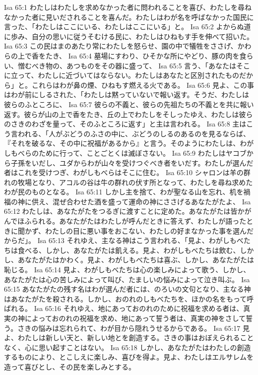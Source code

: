 Isa 65:1  わたしはわたしを求めなかった者に問われることを喜び、わたしを尋ねなかった者に見いだされることを喜んだ。わたしはわが名を呼ばなかった国民に言った、「わたしはここにいる、わたしはここにいる」と。
Isa 65:2  よからぬ道に歩み、自分の思いに従うそむける民に、わたしはひねもす手を伸べて招いた。
Isa 65:3  この民はまのあたり常にわたしを怒らせ、園の中で犠牲をささげ、かわらの上で香をたき、
Isa 65:4  墓場にすわり、ひそかな所にやどり、豚の肉を食らい、憎むべき物の、あつものをその器に盛って、
Isa 65:5  言う、「あなたはそこに立って、わたしに近づいてはならない。わたしはあなたと区別されたものだから」と。これらはわが鼻の煙、ひねもす燃える火である。
Isa 65:6  見よ、この事はわが前にしるされた、「わたしは黙っていないで報い返す。そうだ、わたしは彼らのふところに、
Isa 65:7  彼らの不義と、彼らの先祖たちの不義とを共に報い返す。彼らが山の上で香をたき、丘の上でわたしをそしったゆえ、わたしは彼らのさきのわざを量って、そのふところに返す」と主は言われる。
Isa 65:8  主はこう言われる、「人がぶどうのふさの中に、ぶどうのしるのあるのを見るならば、『それを破るな、その中に祝福があるから』と言う。そのようにわたしは、わがしもべらのために行って、ことごとくは滅ぼさない。
Isa 65:9  わたしはヤコブから子孫をいだし、ユダからわが山々を受けつぐべき者をいだす。わたしが選んだ者はこれを受けつぎ、わがしもべらはそこに住む。
Isa 65:10  シャロンは羊の群れの牧場となり、アコルの谷は牛の群れの伏す所となって、わたしを尋ね求めたわが民のものとなる。
Isa 65:11  しかし主を捨て、わが聖なる山を忘れ、机を禍福の神に供え、混ぜ合わせた酒を盛って運命の神にささげるあなたがたよ、
Isa 65:12  わたしは、あなたがたをつるぎに渡すことに定めた。あなたがたは皆かがんでほふられる。あなたがたはわたしが呼んだときに答えず、わたしが語ったときに聞かず、わたしの目に悪い事をおこない、わたしの好まなかった事を選んだからだ」。
Isa 65:13  それゆえ、主なる神はこう言われる、「見よ、わがしもべたちは食べる、しかし、あなたがたは飢える。見よ、わがしもべたちは飲む、しかし、あなたがたはかわく。見よ、わがしもべたちは喜ぶ、しかし、あなたがたは恥じる。
Isa 65:14  見よ、わがしもべたちは心の楽しみによって歌う、しかし、あなたがたは心の苦しみによって叫び、たましいの悩みによって泣き叫ぶ。
Isa 65:15  あなたがたの残す名はわが選んだ者には、のろいの文句となり、主なる神はあなたがたを殺される。しかし、おのれのしもべたちを、ほかの名をもって呼ばれる。
Isa 65:16  それゆえ、地にあっておのれのために祝福を求める者は、真実の神によっておのれの祝福を求め、地にあって誓う者は、真実の神をさして誓う。さきの悩みは忘れられて、わが目から隠れうせるからである。
Isa 65:17  見よ、わたしは新しい天と、新しい地とを創造する。さきの事はおぼえられることなく、心に思い起すことはない。
Isa 65:18  しかし、あなたがたはわたしの創造するものにより、とこしえに楽しみ、喜びを得よ。見よ、わたしはエルサレムを造って喜びとし、その民を楽しみとする。
